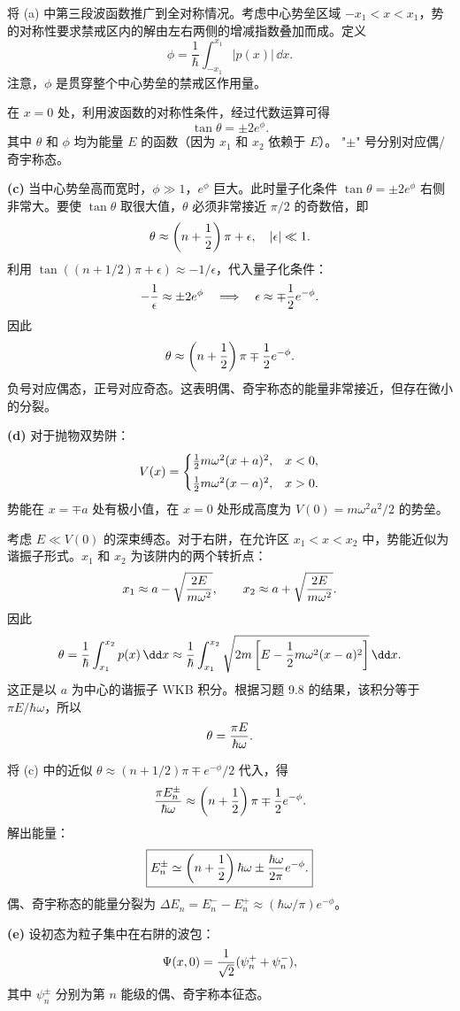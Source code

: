 \begin{solution}
将 (a) 中第三段波函数推广到全对称情况。考虑中心势垒区域 $-x_1<x<x_1$，势的对称性要求禁戒区内的解由左右两侧的增减指数叠加而成。定义
\[
\phi=\frac{1}{\hbar}\int_{-x_1}^{x_1}|p(x)|\,\dd x.
\]
注意，$\phi$ 是贯穿整个中心势垒的禁戒区作用量。

在 $x=0$ 处，利用波函数的对称性条件，经过代数运算可得
\[
\boxed{\tan\theta=\pm2e^\phi.}
\]
其中 $\theta$ 和 $\phi$ 均为能量 $E$ 的函数（因为 $x_1$ 和 $x_2$ 依赖于 $E$）。 "$\pm$" 号分别对应偶/奇宇称态。

\textbf{(c)} 当中心势垒高而宽时，$\phi\gg1$，$e^\phi$ 巨大。此时量子化条件 $\tan\theta=\pm2e^\phi$ 右侧非常大。要使 $\tan\theta$ 取很大值，$\theta$ 必须非常接近 $\pi/2$ 的奇数倍，即
\[
\theta\approx\left(n+{1\over2}\right)\pi+\epsilon,\quad |\epsilon|\ll1.
\]
利用 $\tan\left((n+1/2)\pi+\epsilon\right)\approx-1/\epsilon$，代入量子化条件：
\[
-{1\over\epsilon}\approx\pm2e^\phi\quad\Longrightarrow\quad
\epsilon\approx\mp{1\over2}e^{-\phi}.
\]
因此
\[
\theta\approx\left(n+{1\over2}\right)\pi\mp{1\over2}e^{-\phi}.
\]
负号对应偶态，正号对应奇态。这表明偶、奇宇称态的能量非常接近，但存在微小的分裂。

\textbf{(d)} 对于抛物双势阱：
\[
V(x)=\begin{cases}
{1\over2}m\omega^2(x+a)^2, & x<0,\\[4pt]
{1\over2}m\omega^2(x-a)^2, & x>0.
\end{cases}
\]
势能在 $x=\mp a$ 处有极小值，在 $x=0$ 处形成高度为 $V(0)=m\omega^2a^2/2$ 的势垒。

考虑 $E\ll V(0)$ 的深束缚态。对于右阱，在允许区 $x_1<x<x_2$ 中，势能近似为谐振子形式。$x_1$ 和 $x_2$ 为该阱内的两个转折点：
\[
x_1\approx a-\sqrt{2E\over m\omega^2},\qquad
x_2\approx a+\sqrt{2E\over m\omega^2}.
\]
因此
\[
\theta={1\over\hbar}\int_{x_1}^{x_2}p(x)\,\dd x
\approx{1\over\hbar}\int_{x_1}^{x_2}\sqrt{2m\left[E-{1\over2}m\omega^2(x-a)^2\right]}\,\dd x.
\]
这正是以 $a$ 为中心的谐振子 WKB 积分。根据习题 9.8 的结果，该积分等于 $\pi E/\hbar\omega$，所以
\[
\theta={\pi E\over\hbar\omega}.
\]

将 (c) 中的近似 $\theta\approx(n+1/2)\pi\mp e^{-\phi}/2$ 代入，得
\[
{\pi E_n^\pm\over\hbar\omega}\approx\left(n+{1\over2}\right)\pi\mp{1\over2}e^{-\phi}.
\]
解出能量：
\[
\boxed{E_n^\pm\simeq\left(n+{1\over2}\right)\hbar\omega
\pm{\hbar\omega\over2\pi}e^{-\phi}.}
\]
偶、奇宇称态的能量分裂为 $\Delta E_n=E_n^--E_n^+\approx(\hbar\omega/\pi)e^{-\phi}$。

\textbf{(e)} 设初态为粒子集中在右阱的波包：
\[
\Psi(x,0)={1\over\sqrt2}(\psi_n^++\psi_n^-),
\]
其中 $\psi_n^\pm$ 分别为第 $n$ 能级的偶、奇宇称本征态。


\end{solution}
